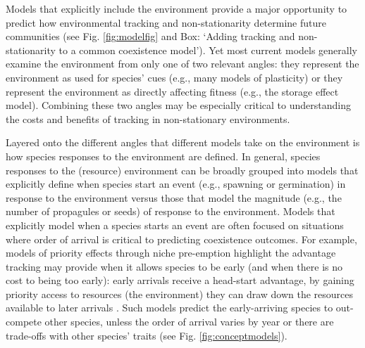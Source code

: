 \documentclass[11pt,letterpaper]{article}
\begin{document}
Models that explicitly include the environment provide a major opportunity to predict how environmental tracking and non-stationarity determine future communities (see Fig. \ref{fig:modelfig} and Box: `Adding tracking and non-stationarity to a common coexistence model'). Yet most current models generally examine the environment from only one of two relevant angles: they represent the environment as used for species' cues (e.g., many models of plasticity) or they represent the environment as directly affecting fitness (e.g., the storage effect model). Combining these two angles may be especially critical to understanding the costs and benefits of tracking in non-stationary environments.  

Layered onto the different angles that different models take on the environment is how species responses to the environment are defined. In general, species responses to the (resource) environment can be broadly grouped into models that explicitly define when species start an event (e.g., spawning or germination) in response to the environment versus those that model the magnitude (e.g., the number of propagules or seeds) of response to the environment. Models that explicitly model when a species starts an event are often focused on situations where order of arrival is critical to predicting coexistence outcomes. For example, models of priority effects through niche pre-emption highlight the advantage tracking may provide when it allows species to be early (and when there is no cost to being too early): early arrivals receive a head-start advantage, by gaining priority access to resources (the environment) they can draw down the resources available to later arrivals \citep{fukami2015}. Such models predict the early-arriving species to out-compete other species, unless the order of arrival varies by year or there are trade-offs with other species' traits (see Fig. \ref{fig:conceptmodels}).
\end{document}
